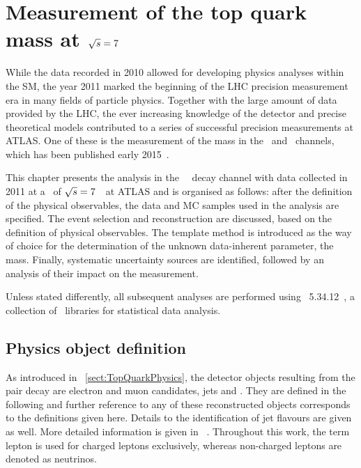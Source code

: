 \chapter{Measurement of the top quark mass at \texorpdfstring{${\sqrt{s}}=7$}{sqrt(s)=7}~\TeV}
\label{chap:topmass7TeV}
%
While the data recorded in 2010 allowed for developing physics analyses within the \gls{SM}, the year 2011 marked the beginning of the \gls{LHC} precision measurement era in many fields of particle physics. 
%
Together with the large amount of data provided by the \gls{LHC}, the ever increasing knowledge of the detector and precise theoretical models contributed to a series of successful precision measurements at \gls{ATLAS}. 
%
One of these is the measurement of the \tquark mass in the \dil\ and \ljets\ channels, which has been published early 2015~\cite{Aad:2015nba}. 
%


This chapter presents the analysis in the \dileptonic\ \ttbar\ decay channel with data collected in 2011 at a \cme\ of ${\sqrt{s}}=7$~\TeV\ at \gls{ATLAS} and is organised as follows:  
%
after the definition of the physical observables, the data and \gls{MC} samples used in the analysis are specified. 
%
The event selection and reconstruction are discussed, based on the definition of physical observables. 
%
The template method is introduced as the way of choice for the determination of the unknown data-inherent parameter, the \tquark mass. 
%
Finally, systematic uncertainty sources are identified, followed by an analysis of their impact on the measurement. 

Unless stated differently, all subsequent analyses are performed using \Root~5.34.12~\cite{Brun199781}, a collection of \Cpp\ libraries for statistical data analysis.






\section{Physics object definition}
\label{sect:physobj7TeV}
As introduced in \sect~\ref{sect:TopQuarkPhysics}, the detector objects resulting from the \tquark pair decay are electron and muon candidates, jets and \met. 
%
They are defined in the following and further reference to any of these reconstructed objects corresponds to the definitions given here. Details to the identification of jet flavours are given as well.
%
More detailed information is given in ~\cite{Acharya:1472525}.
%
Throughout this work, the term lepton is used for charged leptons exclusively, whereas non-charged leptons are denoted as neutrinos.

